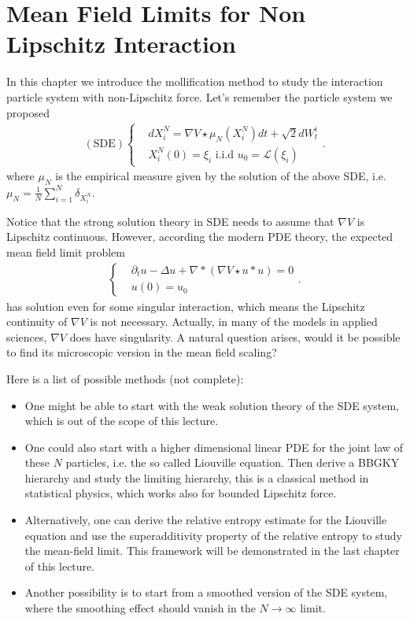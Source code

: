 \chapter{Mean Field Limits for Non Lipschitz Interaction}

In this chapter we introduce the mollification method to study the interaction particle system with non-Lipschitz force. Let's remember the particle system we proposed
\begin{align*}
(\text{SDE})\begin{cases}
&dX_i^N = \nabla V \star  \mu_N(X_i^{N} ) dt + \sqrt{2}dW_t^i\\
&X_i^N(0) = \xi_i \text{ i.i.d } u_{0}=\mathcal{L}(\xi_i)
\end{cases}
.\end{align*}  
where $\mu_N$ is the empirical measure given by the solution of the above SDE, i.e. $\mu_N = \frac{1}{N} \sum_{i=1}^{N} \delta_{X_i^N}$.

Notice that the strong solution theory in SDE needs to assume that  $\nabla V$ is Lipschitz continuous. However, according the modern PDE theory, the expected mean field limit problem 
\begin{align*}
\begin{cases}
&\partial_t u - \Delta u + \nabla * (\nabla V \star  u * u) = 0\\
&u(0) = u_{0}
\end{cases}
.\end{align*}
has solution even for some singular interaction, which means the Lipschitz continuity of $\nabla V$ is not necessary. Actually, in many of the models in applied sciences, $\nabla V$ does have singularity. A natural question arises, would it be possible to find its microscopic version in the mean field scaling? 

Here is a list of possible methods (not complete):
\begin{itemize}
	\item One might be able to start with the weak solution theory of the SDE system, which is out of the scope of this lecture. 
	\item One could also start with a higher dimensional linear PDE for the joint law of these $N$ particles, i.e. the so called Liouville equation. Then derive a BBGKY hierarchy and study the limiting hierarchy, this is a classical method in statistical physics, which works also for bounded Lipschitz force.
	\item  Alternatively, one can derive the relative entropy estimate for the Liouville equation and use the superadditivity property of the relative entropy to study the mean-field limit. This framework will be demonstrated in the last chapter of this lecture.
	\item Another possibility is to start from a smoothed version of the SDE system, where the smoothing effect should vanish in the $N\to \infty$ limit. 
\end{itemize}


